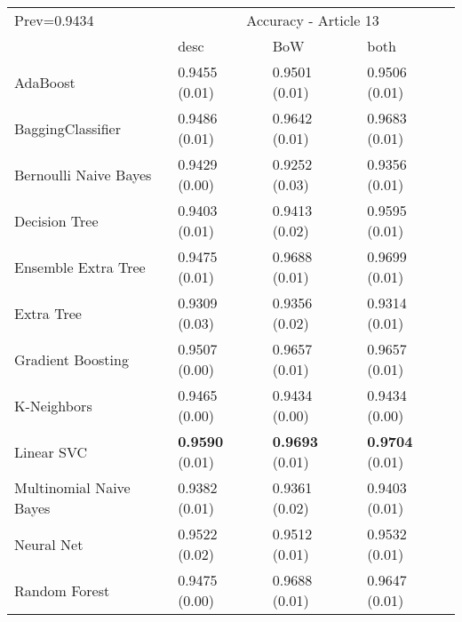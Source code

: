 \begin{tabular}{|l|l|l|l| }
\hline
Prev=0.9434 &  \multicolumn{3}{c|}{Accuracy - Article 13} \\
\cline{2-4} & desc & BoW & both \\ \hline
AdaBoost                & 0.9455 (0.01) & 0.9501 (0.01) & 0.9506 (0.01)\\
BaggingClassifier       & 0.9486 (0.01) & 0.9642 (0.01) & 0.9683 (0.01)\\
Bernoulli Naive Bayes   & 0.9429 (0.00) & 0.9252 (0.03) & 0.9356 (0.01)\\
Decision Tree           & 0.9403 (0.01) & 0.9413 (0.02) & 0.9595 (0.01)\\
Ensemble Extra Tree     & 0.9475 (0.01) & 0.9688 (0.01) & 0.9699 (0.01)\\
Extra Tree              & 0.9309 (0.03) & 0.9356 (0.02) & 0.9314 (0.01)\\
Gradient Boosting       & 0.9507 (0.00) & 0.9657 (0.01) & 0.9657 (0.01)\\
K-Neighbors             & 0.9465 (0.00) & 0.9434 (0.00) & 0.9434 (0.00)\\
Linear SVC              & {\bf 0.9590} (0.01) & {\bf 0.9693} (0.01) & {\bf 0.9704} (0.01)\\
Multinomial Naive Bayes & 0.9382 (0.01) & 0.9361 (0.02) & 0.9403 (0.01)\\
Neural Net              & 0.9522 (0.02) & 0.9512 (0.01) & 0.9532 (0.01)\\
Random Forest           & 0.9475 (0.00) & 0.9688 (0.01) & 0.9647 (0.01)\\
\hline
\end{tabular}